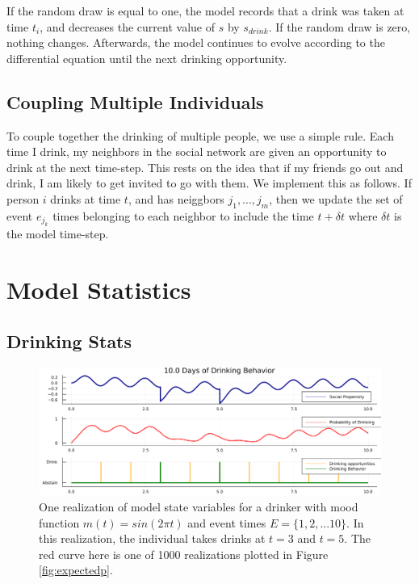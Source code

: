 \documentclass{journal}
\theoremstyle{definition}
\begin{document}
If the random draw is equal to one, the model records that a drink was taken at time $t_i$, and decreases the current value of $s$ by $s_{drink}$.  If the random draw is zero, nothing changes.
Afterwards, the model continues to evolve according to the differential equation until the next drinking opportunity.

\subsection*{Coupling Multiple Individuals}

To couple together the drinking of multiple people, we use a simple rule. Each time I drink, my neighbors in the social network are given an opportunity to drink at the next time-step. This rests on the idea that if my friends go out and drink, I am likely to get invited to go with them. We implement this as follows. If person $i$ drinks at time $t$, and has neiggbors $j_1, ..., j_m$, then we update the set of event $e_{j_k}$ times belonging to each neighbor to include the time $t + \delta t$ where $\delta t$ is the model time-step.

\section*{Model Statistics}

\subsection*{Drinking Stats}
\begin{figure}[h] \label{fig:uniformdrinker}
	\includegraphics[width=\textwidth]{uniform_person.png}
	\caption{One realization of model state variables for a drinker with mood function $m(t) = sin(2\pi t) $ and event times $E = \{1, 2, ... 10\}$. In this realization, the individual takes drinks at $t=3$ and $t=5$. The red curve here is one of 1000 realizations plotted in Figure \ref{fig:expectedp}.}
\end{figure}
\end{document}
